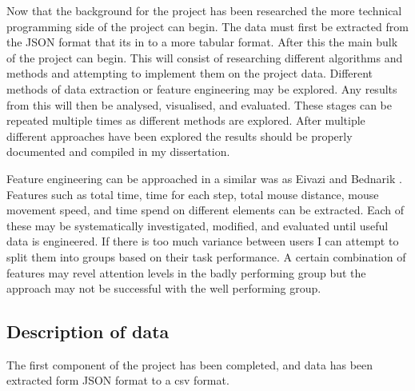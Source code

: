 \documentclass{article}
\begin{document}
Now that the background for the project has been researched the more technical programming side of the project can begin.
The data must first be extracted from the JSON format that its in to a more tabular format.
After this the main bulk of the project can begin.
This will consist of researching different algorithms and methods and attempting to implement them on the project data.
Different methods of data extraction or feature engineering may be explored.
Any results from this will then be analysed, visualised, and evaluated.
These stages can be repeated multiple times as different methods are explored.
After multiple different approaches have been explored the results should be properly documented and compiled in my dissertation.


Feature engineering can be approached in a similar was as Eivazi and Bednarik \cite{eivazi2011predicting}.
Features such as total time, time for each step, total mouse distance, mouse movement speed, and time spend on different elements can be extracted.
Each of these may be systematically investigated, modified, and evaluated until useful data is engineered.
If there is too much variance between users I can attempt to split them into groups based on their task performance.
A certain combination of features may revel attention levels in the badly performing group but the approach may not be successful with the well performing group. 


\subsection{Description of data}

The first component of the project has been completed, and data has been extracted form JSON format to a csv format.
\end{document}
